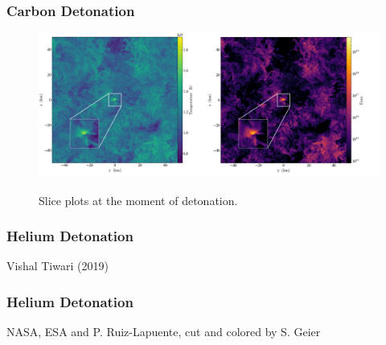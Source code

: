 \documentclass{beamer}
\begin{document}


\begin{frame}
\frametitle{Carbon Detonation}

        \begin{figure}
    \begin{center}
      \includegraphics[width=.90\linewidth]{slice.png}
    \end{center}
		\begin{center}
			Slice plots at the moment of detonation.
		\end{center}
  \end{figure}


\end{frame}



\begin{frame}

        \frametitle{Helium Detonation}
        \begin{center}
		\end{center}
		\begin{center}
			Vishal Tiwari (2019)
		\end{center}
\end{frame}


\begin{frame}
	\frametitle{Helium Detonation}

        \begin{center}
        \end{center}
	\begin{center}
		NASA, ESA and P. Ruiz-Lapuente, cut and colored by S. Geier
	\end{center}
\end{frame}
\end{document}
